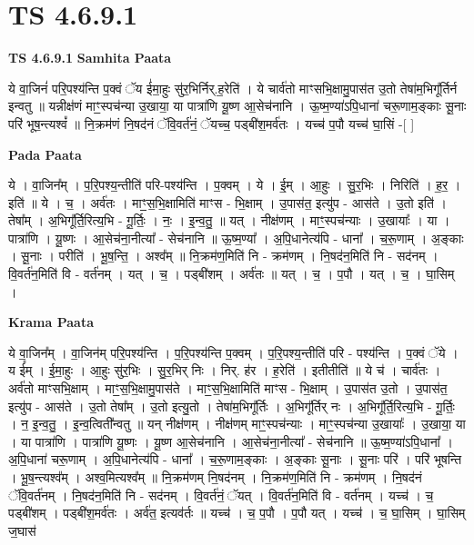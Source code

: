 \documentclass[17pt]{extarticle}
\begin{document}
\section{ TS 4.6.9.1 }

\textbf{TS 4.6.9.1 } \newline
\textbf{Samhita Paata} \newline

ये वा॒जिनं॑ परि॒पश्य॑न्ति प॒क्वं ॅय ई॑मा॒हुः सु॑र॒भिर्निर्.ह॒रेति॑ । ये चार्व॑तो माꣳसभि॒क्षामु॒पास॑त उ॒तो तेषा॑म॒भिगू᳚र्तिर्न इन्वतु ॥ यन्नीक्ष॑णं माꣳ॒॒स्पच॑न्या उ॒खाया॒ या पात्रा॑णि यू॒ष्ण आ॒सेच॑नानि । ऊ॒ष्म॒ण्या॑ऽपि॒धाना॑ चरू॒णाम॒ङ्काः सू॒नाः परि॑ भूष॒न्त्यश्वं᳚ ॥ नि॒क्रम॑णं नि॒षद॑नं ॅवि॒वर्त॑नं॒ ॅयच्च॒ पड्बी॑श॒मर्व॑तः । यच्च॑ प॒पौ यच्च॑ घा॒सिं -[  ] \newline

\textbf{Pada Paata} \newline

ये । वा॒जिन᳚म् । प॒रि॒पश्य॒न्तीति॑ परि-पश्य॑न्ति । प॒क्वम् । ये । ई॒म् । आ॒हुः । सु॒र॒भिः । निरिति॑ । ह॒र॒ । इति॑ ॥ ये । च॒ । अर्व॑तः । माꣳ॒॒स॒भि॒क्षामिति॑ माꣳस - भि॒क्षाम् । उ॒पास॑त॒ इत्यु॑प - आस॑ते । उ॒तो इति॑ । तेषा᳚म् । अ॒भिगू᳚र्ति॒रित्य॒भि - गू॒र्तिः॒ । नः॒ । इ॒न्व॒तु॒ ॥ यत् । नीक्ष॑णम् । माꣳ॒॒स्पच॑न्याः । उ॒खायाः᳚ । या । पात्रा॑णि । यू॒ष्णः । आ॒सेच॑ना॒नीत्या᳚ - सेच॑नानि ॥ ऊ॒ष्म॒ण्या᳚ । अ॒पि॒धानेत्य॑पि - धाना᳚ । च॒रू॒णाम् । अ॒ङ्काः । सू॒नाः । परीति॑ । भू॒ष॒न्ति॒ । अश्व᳚म् ॥ नि॒क्रम॑ण॒मिति॑ नि - क्रम॑णम् । नि॒षद॑न॒मिति॑ नि - सद॑नम् । वि॒वर्त॑न॒मिति॑ वि - वर्त॑नम् । यत् । च॒ । पड्बी॑शम् । अर्व॑तः ॥ यत् । च॒ । प॒पौ । यत् । च॒ । घा॒सिम् ।  \newline


\textbf{Krama Paata} \newline

ये वा॒जिन᳚म् । वा॒जिन॑म् परि॒पश्य॑न्ति । प॒रि॒पश्य॑न्ति प॒क्वम् । प॒रि॒पश्य॒न्तीति॑ परि - पश्य॑न्ति । प॒क्वं ॅये । य ई᳚म् । ई॒मा॒हुः । आ॒हुः सु॑र॒भिः । सु॒र॒भिर् निः । निर्. ह॑र । ह॒रेति॑ । इतीतीति॑ ॥ ये च॑ । चार्व॑तः । अर्व॑तो माꣳसभि॒क्षाम् । माꣳ॒॒स॒भि॒क्षामु॒पास॑ते । माꣳ॒॒स॒भि॒क्षामिति॑ माꣳस - भि॒क्षाम् । उ॒पास॑त उ॒तो । उ॒पास॑त॒ इत्यु॑प - आस॑ते । उ॒तो तेषा᳚म् । उ॒तो इत्यु॒तो । तेषा॑म॒भिगू᳚र्तिः । अ॒भिगू᳚र्तिर् नः । अ॒भिगू᳚र्ति॒रित्य॒भि - गू॒र्तिः॒ । न॒ इ॒न्व॒तु॒ । इ॒न्व॒त्विती᳚न्वतु ॥ यन् नीक्ष॑णम् । नीक्ष॑णम् माꣳ॒॒स्पच॑न्याः । माꣳ॒॒स्पच॑न्या उ॒खायाः᳚ । उ॒खाया॒ या । या पात्रा॑णि । पात्रा॑णि यू॒ष्णः । यू॒ष्ण आ॒सेच॑नानि । आ॒सेच॑ना॒नीत्या᳚ - सेच॑नानि ॥ ऊ॒ष्म॒ण्या॑ऽपि॒धाना᳚ । अ॒पि॒धाना॑ चरू॒णाम् । अ॒पि॒धानेत्य॑पि - धाना᳚ । च॒रू॒णाम॒ङ्काः । अ॒ङ्काः सू॒नाः । सू॒नाः परि॑ । परि॑ भूषन्ति । भू॒ष॒न्त्यश्व᳚म् । अश्व॒मित्यश्व᳚म् ॥ नि॒क्रम॑णम् नि॒षद॑नम् । नि॒क्रम॑ण॒मिति॑ नि - क्रम॑णम् । नि॒षद॑नं ॅवि॒वर्त॑नम् । नि॒षद॑न॒मिति॑ नि - सद॑नम् । वि॒वर्त॑नं॒ ॅयत् । वि॒वर्त॑न॒मिति॑ वि - वर्त॑नम् । यच्च॑ । च॒ पड्बी॑शम् । पड्बी॑श॒मर्व॑तः । अर्व॑त॒ इत्यव॑र्तः ॥ यच्च॑ । च॒ प॒पौ । प॒पौ यत् । यच्च॑ । च॒ घा॒सिम् । घा॒सिम् ज॒घास॑ \newline
\end{document}

